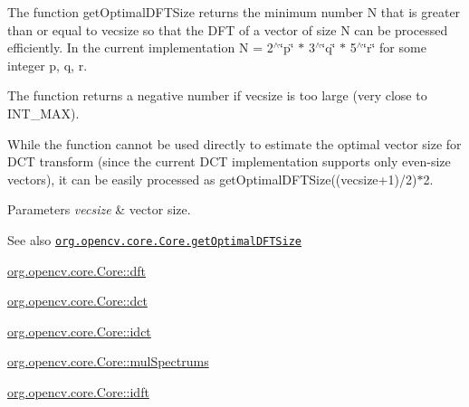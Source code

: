The function {\ttfamily get\+Optimal\+D\+F\+T\+Size} returns the minimum number {\ttfamily N} that is greater than or equal to {\ttfamily vecsize} so that the D\+FT of a vector of size {\ttfamily N} can be processed efficiently. In the current implementation {\ttfamily N} = 2$^\wedge$\char`\"{}p\char`\"{} $\ast$ 3$^\wedge$\char`\"{}q\char`\"{} $\ast$ 5$^\wedge$\char`\"{}r\char`\"{} for some integer {\ttfamily p}, {\ttfamily q}, {\ttfamily r}.

The function returns a negative number if {\ttfamily vecsize} is too large (very close to {\ttfamily I\+N\+T\+\_\+\+M\+AX}).

While the function cannot be used directly to estimate the optimal vector size for D\+CT transform (since the current D\+CT implementation supports only even-\/size vectors), it can be easily processed as {\ttfamily get\+Optimal\+D\+F\+T\+Size((vecsize+1)/2)$\ast$2}.


\begin{DoxyParams}{Parameters}
{\em vecsize} & vector size.\\
\hline
\end{DoxyParams}
\begin{DoxySeeAlso}{See also}
\href{http://docs.opencv.org/modules/core/doc/operations_on_arrays.html#getoptimaldftsize}{\tt org.\+opencv.\+core.\+Core.\+get\+Optimal\+D\+F\+T\+Size} 

\mbox{\hyperlink{classorg_1_1opencv_1_1core_1_1_core_a43313221157a3008972a04727a65a58d}{org.\+opencv.\+core.\+Core\+::dft}} 

\mbox{\hyperlink{classorg_1_1opencv_1_1core_1_1_core_a1f0b3c28295d4db1ecd755201833d6cb}{org.\+opencv.\+core.\+Core\+::dct}} 

\mbox{\hyperlink{classorg_1_1opencv_1_1core_1_1_core_a64eb690877f2d4ac16c1b1c3375c0b7b}{org.\+opencv.\+core.\+Core\+::idct}} 

\mbox{\hyperlink{classorg_1_1opencv_1_1core_1_1_core_a249146033929c968ef948e290c2a438c}{org.\+opencv.\+core.\+Core\+::mul\+Spectrums}} 

\mbox{\hyperlink{classorg_1_1opencv_1_1core_1_1_core_a4fc0b0f22fef014f5e602e8d5b367a44}{org.\+opencv.\+core.\+Core\+::idft}} 
\end{DoxySeeAlso}
\mbox{\label{classorg_1_1opencv_1_1core_1_1_core_ab6071e8e7cb8266aad46d7d95cb73fe7}} 
